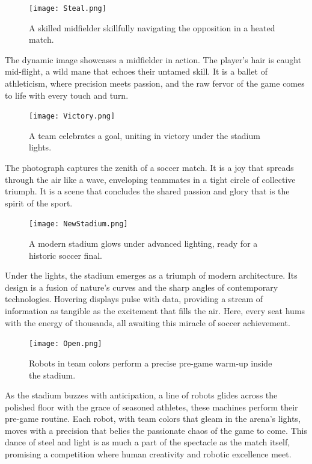 \documentclass[11pt,a4paper,oneside]{report}
\begin{document}
\newpage

\begin{figure}[htbp]
  \centering
  \texttt{[image: Steal.png]}
  \caption{A skilled midfielder skillfully navigating the opposition in a heated match.}
\end{figure}

The dynamic image showcases a midfielder in action.
The player's hair is caught mid-flight, a wild mane that echoes their untamed skill.
It is a ballet of athleticism, where precision meets passion, and the raw fervor of the game comes to life with every touch and turn.
\newpage

\begin{figure}[htbp]
  \centering
  \texttt{[image: Victory.png]}
  \caption{A team celebrates a goal, uniting in victory under the stadium lights.}
\end{figure}

The photograph captures the zenith of a soccer match.
It is a joy that spreads through the air like a wave, enveloping teammates in a tight circle of collective triumph. 
It is a scene that concludes the shared passion and glory that is the spirit of the sport.
\newpage

\begin{figure}[htbp]
  \centering
  \texttt{[image: NewStadium.png]}
  \caption{A modern stadium glows under advanced lighting, ready for a historic soccer final.}
\end{figure}

Under the lights, the stadium emerges as a triumph of modern architecture. 
Its design is a fusion of nature's curves and the sharp angles of contemporary technologies.
Hovering displays pulse with data, providing a stream of information as tangible as the excitement that fills the air. 
Here, every seat hums with the energy of thousands, all awaiting this miracle of soccer achievement.
\newpage

\begin{figure}[htbp]
  \centering
  \texttt{[image: Open.png]}
  \caption{Robots in team colors perform a precise pre-game warm-up inside the stadium.}
\end{figure}

As the stadium buzzes with anticipation, a line of robots glides across the polished floor with the grace of seasoned athletes, these machines perform their pre-game routine. 
Each robot, with team colors that gleam in the arena's lights, moves with a precision that belies the passionate chaos of the game to come. 
This dance of steel and light is as much a part of the spectacle as the match itself, promising a competition where human creativity and robotic excellence meet.
\newpage
\end{document}
